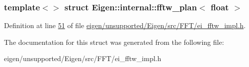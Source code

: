 \subsubsection*{template$<$$>$\newline
struct Eigen\+::internal\+::fftw\+\_\+plan$<$ float $>$}



Definition at line \hyperlink{eigen_2unsupported_2_eigen_2src_2_f_f_t_2ei__fftw__impl_8h_source_l00051}{51} of file \hyperlink{eigen_2unsupported_2_eigen_2src_2_f_f_t_2ei__fftw__impl_8h_source}{eigen/unsupported/\+Eigen/src/\+F\+F\+T/ei\+\_\+fftw\+\_\+impl.\+h}.



The documentation for this struct was generated from the following file\+:\begin{DoxyCompactItemize}
\item 
eigen/unsupported/\+Eigen/src/\+F\+F\+T/ei\+\_\+fftw\+\_\+impl.\+h\end{DoxyCompactItemize}
